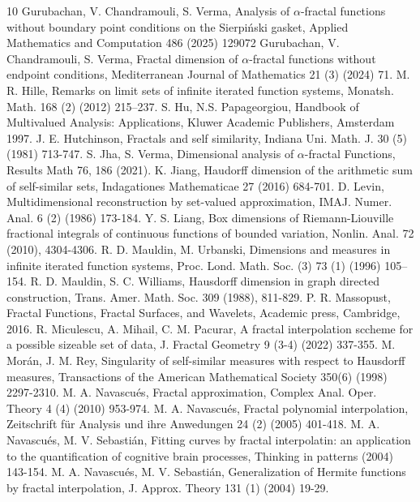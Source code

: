 \documentclass[12pt,oneside,reqno]{amsart}
\theoremstyle{definition}
\theoremstyle{remark}
\begin{document}
\begin{thebibliography}{10}
 Gurubachan, V. Chandramouli, S. Verma, Analysis of $\alpha$-fractal functions without boundary point conditions on the Sierpi\'nski gasket, Applied Mathematics and Computation 486 (2025) 129072
 Gurubachan, V. Chandramouli, S. Verma, Fractal dimension of $\alpha$-fractal functions without endpoint conditions, Mediterranean Journal of Mathematics 21 (3) (2024) 71.
 M. R. Hille, Remarks on limit sets of infinite iterated function systems, Monatsh. Math. 168 (2) (2012) 215–237.
 S. Hu, N.S. Papageorgiou, Handbook of Multivalued Analysis: Applications, Kluwer Academic Publishers, Amsterdam 1997.
 J. E. Hutchinson, Fractals and self similarity, Indiana Uni. Math. J. 30 (5) (1981) 713-747. 
 S. Jha, S. Verma, Dimensional analysis of $\alpha$-fractal Functions, Results Math 76, 186 (2021).
 K. Jiang, Haudorff dimension of the arithmetic sum of self-similar sets, Indagationes Mathematicae 27 (2016) 684-701.
 D. Levin, Multidimensional reconstruction by set-valued approximation, IMAJ. Numer. Anal. 6 (2) (1986) 173-184.
 Y. S. Liang, Box dimensions of Riemann-Liouville fractional integrals of continuous functions of bounded variation, Nonlin. Anal. 72 (2010), 4304-4306.
 R. D. Mauldin, M. Urbanski, Dimensions and measures in infinite iterated function systems, Proc. Lond.
Math. Soc. (3) 73 (1) (1996) 105–154.
 R. D. Mauldin, S. C. Williams, Hausdorff dimension in graph directed construction, Trans. Amer. Math. Soc. 309 (1988), 811-829.
 P. R. Massopust, Fractal Functions, Fractal Surfaces, and Wavelets, Academic press, Cambridge, 2016.
 R. Miculescu, A. Mihail, C. M. Pacurar, A fractal interpolation sccheme for a possible sizeable set of data, J. Fractal Geometry 9 (3-4) (2022) 337-355.
 M. Mor\'an, J. M. Rey, Singularity of self-similar measures with respect to Hausdorff measures, Transactions of
the American Mathematical Society 350(6) (1998) 2297-2310.
 M. A. Navascu\'es, Fractal approximation, Complex Anal. Oper. Theory 4 (4) (2010) 953-974.
 M. A. Navascu\'es, Fractal polynomial interpolation, Zeitschrift f\"ur Analysis und ihre Anwedungen 24 (2) (2005) 401-418.
 M. A. Navascu\'es, M. V. Sebasti\'an, Fitting curves by fractal interpolatin: an application to the quantification of cognitive brain processes, Thinking in patterns (2004) 143-154.
 M. A. Navascu\'es, M. V. Sebasti\'an, Generalization of Hermite functions by fractal interpolation, J. Approx. Theory 131 (1) (2004) 19-29.

\end{thebibliography}
\end{document}
